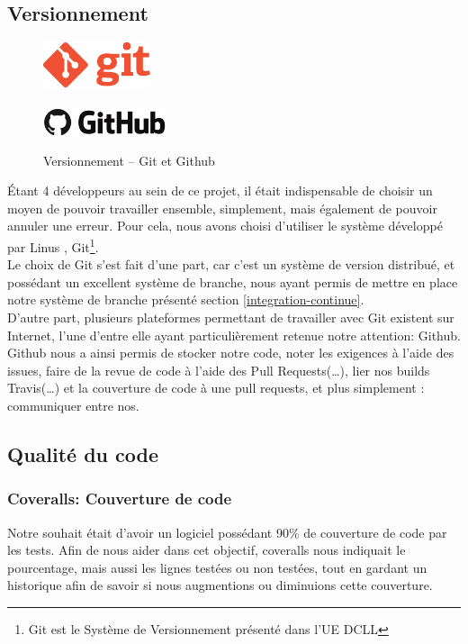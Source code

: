 \subsection{Versionnement}
\begin{figure}
\begin{center}
\includegraphics[width=0.28\textwidth]{../beamer/logos/git.png}\\~\\
\includegraphics[width=0.32\textwidth]{../beamer/logos/github.png}
\end{center}
\caption{Versionnement -- Git et Github}
\end{figure}
Étant 4 développeurs au sein de ce projet, il était indispensable de choisir un moyen de pouvoir travailler ensemble, simplement, mais
également de pouvoir annuler une erreur. Pour cela, nous avons choisi d'utiliser le système développé par Linus , Git\footnote{Git
est le Système de Versionnement présenté dans l'UE DCLL}.\\
Le choix de Git s'est fait d'une part, car c'est un système de version distribué, et possédant un excellent système de branche, nous ayant
permis de mettre en place notre système de branche présenté section \ref{integration-continue}.\\
D'autre part, plusieurs plateformes
permettant de travailler avec Git existent sur Internet, l'une d'entre elle ayant particulièrement retenue notre attention: Github.\\
Github nous a ainsi permis de stocker notre code, noter les exigences à l'aide des issues, faire de la revue de code à l'aide des Pull
Requests(…), lier nos builds Travis(…) et la couverture de code à une pull requests, et plus simplement : communiquer entre nos.

\subsection{Qualité du code}
\subsubsection{Coveralls: Couverture de code}
Notre souhait était d'avoir un logiciel possédant 90\% de couverture de code par les tests. Afin de nous aider dans cet objectif, coveralls
nous indiquait le pourcentage, mais aussi les lignes testées ou non testées, tout en gardant un historique afin de savoir si nous
augmentions ou diminuions cette couverture.

